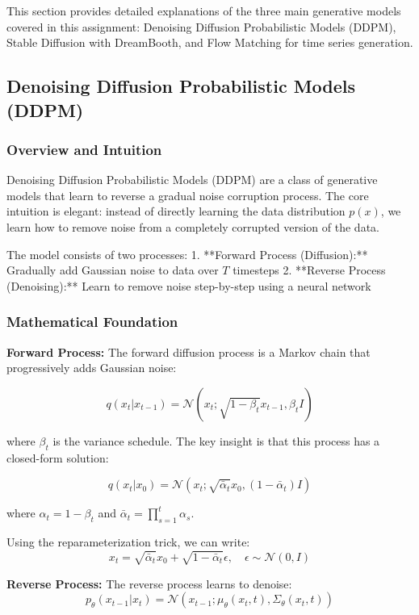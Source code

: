 \documentclass[a4paper,12pt]{article}
\begin{document}
This section provides detailed explanations of the three main generative models covered in this assignment: Denoising Diffusion Probabilistic Models (DDPM), Stable Diffusion with DreamBooth, and Flow Matching for time series generation.

\subsection{Denoising Diffusion Probabilistic Models (DDPM)}

\subsubsection{Overview and Intuition}

Denoising Diffusion Probabilistic Models (DDPM) are a class of generative models that learn to reverse a gradual noise corruption process. The core intuition is elegant: instead of directly learning the data distribution $p(x)$, we learn how to remove noise from a completely corrupted version of the data.

The model consists of two processes:
1. **Forward Process (Diffusion):** Gradually add Gaussian noise to data over $T$ timesteps
2. **Reverse Process (Denoising):** Learn to remove noise step-by-step using a neural network

\subsubsection{Mathematical Foundation}

\textbf{Forward Process:} The forward diffusion process is a Markov chain that progressively adds Gaussian noise:

\[ q(x_t | x_{t-1}) = \mathcal{N}(x_t; \sqrt{1-\beta_t} x_{t-1}, \beta_t I) \]

where $\beta_t$ is the variance schedule. The key insight is that this process has a closed-form solution:

\[ q(x_t | x_0) = \mathcal{N}(x_t; \sqrt{\bar{\alpha}_t} x_0, (1-\bar{\alpha}_t) I) \]

where $\alpha_t = 1 - \beta_t$ and $\bar{\alpha}_t = \prod_{s=1}^t \alpha_s$.

Using the reparameterization trick, we can write:
\[ x_t = \sqrt{\bar{\alpha}_t} x_0 + \sqrt{1-\bar{\alpha}_t} \epsilon, \quad \epsilon \sim \mathcal{N}(0, I) \]

\textbf{Reverse Process:} The reverse process learns to denoise:
\[ p_\theta(x_{t-1} | x_t) = \mathcal{N}(x_{t-1}; \mu_\theta(x_t, t), \Sigma_\theta(x_t, t)) \]
\end{document}
